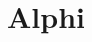 \documentclass[a4paper,12pt]{article}
\title{Alphi}
\author{}
\begin{document}
\maketitle
\tableofcontents

\begin{abstract}
\end{abstract}


\section{}
\end{document}
